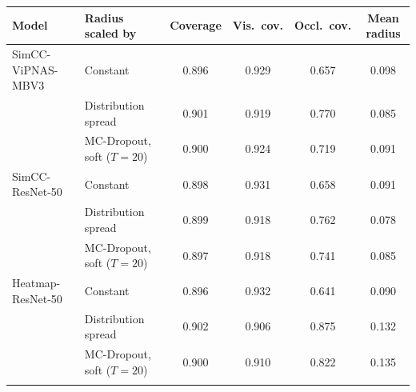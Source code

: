 \begin{tabular}{llcccc}
\toprule
Model & Radius scaled by & Coverage & Vis.\ cov. & Occl.\ cov. & Mean radius \\
\midrule
SimCC-ViPNAS-MBV3 & Constant & 0.896 & 0.929 & 0.657 & 0.098 \\
 & Distribution spread & 0.901 & 0.919 & 0.770 & 0.085 \\
 & MC-Dropout, soft ($T{=}20$) & 0.900 & 0.924 & 0.719 & 0.091 \\
\addlinespace
SimCC-ResNet-50 & Constant & 0.898 & 0.931 & 0.658 & 0.091 \\
 & Distribution spread & 0.899 & 0.918 & 0.762 & 0.078 \\
 & MC-Dropout, soft ($T{=}20$) & 0.897 & 0.918 & 0.741 & 0.085 \\
\addlinespace
Heatmap-ResNet-50 & Constant & 0.896 & 0.932 & 0.641 & 0.090 \\
 & Distribution spread & 0.902 & 0.906 & 0.875 & 0.132 \\
 & MC-Dropout, soft ($T{=}20$) & 0.900 & 0.910 & 0.822 & 0.135 \\
\addlinespace
\bottomrule
\end{tabular}
